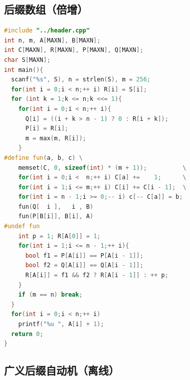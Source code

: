 \documentclass[10pt]{ctexart}
\begin{document}
\begin{multicols}{3}
    \subsection{后缀数组（倍增）}\label{ux540eux7f00ux6570ux7ec4ux500dux589e}

\begin{lstlisting}[language={C++}]
#include "../header.cpp"
int n, m, A[MAXN], B[MAXN];
int C[MAXN], R[MAXN], P[MAXN], Q[MAXN];
char S[MAXN];
int main(){
  scanf("%s", S), n = strlen(S), m = 256;
  for(int i = 0;i < n;++ i) R[i] = S[i];
  for (int k = 1;k <= n;k <<= 1){
    for(int i = 0;i < n;++ i){
      Q[i] = ((i + k > n - 1) ? 0 : R[i + k]);
      P[i] = R[i];
      m = max(m, R[i]);
    }
#define fun(a, b, c) \
    memset(C, 0, sizeof(int) * (m + 1));          \
    for(int i = 0;i <  n;++ i) C[a] +=    1;      \
    for(int i = 1;i <= m;++ i) C[i] += C[i - 1];  \
    for(int i = n - 1;i >= 0;-- i) c[-- C[a]] = b;
    fun(Q[  i ],   i , B)
    fun(P[B[i]], B[i], A)
#undef fun
    int p = 1; R[A[0]] = 1;
    for(int i = 1;i <= n - 1;++ i){
      bool f1 = P[A[i]] == P[A[i - 1]];
      bool f2 = Q[A[i]] == Q[A[i - 1]];
      R[A[i]] = f1 && f2 ? R[A[i - 1]] : ++ p;
    }
    if (m == n) break;
  }
  for(int i = 0;i < n;++ i)
    printf("%u ", A[i] + 1);
  return 0;
}
\end{lstlisting}

    \subsection{广义后缀自动机（离线）}\label{ux5e7fux4e49ux540eux7f00ux81eaux52a8ux673aux79bbux7ebf}


\end{multicols}
\end{document}
